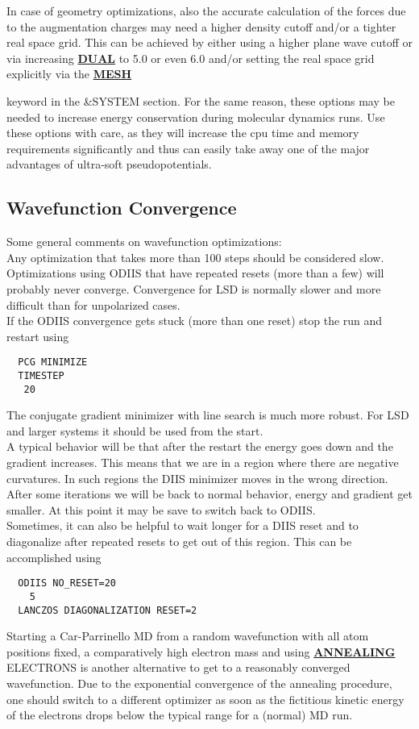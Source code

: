 \documentclass[twoside,10pt,titlepage,a4paper]{article}
\newcommand{\referto}[2]{\hyperlink{#1}{#2}}
\newcommand{\referto}[2]{\htmlref{#2}{#1}}
\newcommand{\refkeyword}[1]{%
\referto{#1}{\textbf{#1}}%
\index{#1}%
}%
\begin{document}
In case of geometry optimizations, also the accurate calculation of the
forces due to the augmentation charges may need a higher density cutoff
and/or a tighter real space grid.
This can be achieved by either using a higher plane wave cutoff or via
increasing \refkeyword{DUAL} to 5.0 or even 6.0 and/or setting
the real space grid explicitly via the \refkeyword{MESH}
keyword in the \&SYSTEM section. For the same reason, these options
may be needed to increase energy conservation during molecular dynamics runs.
Use these options with care, as they will increase the cpu time
and memory requirements significantly and thus can easily take away
one of the major advantages of ultra-soft pseudopotentials.

\subsection{Wavefunction Convergence}\label{hints:wfconv}
Some general comments on wavefunction optimizations:\\[2ex]
%
Any optimization that takes more than 100 steps
should be considered slow.\\[1ex]
%
Optimizations using ODIIS that have repeated resets
(more than a few) will probably never converge.
%
Convergence for LSD is normally slower and more
difficult than for unpolarized cases.\\[1ex]
%
If the ODIIS convergence gets stuck (more than one reset)
stop the run and restart using
\begin{verbatim}
  PCG MINIMIZE
  TIMESTEP
   20
\end{verbatim}
The conjugate gradient minimizer with line search is
much more robust. For LSD and larger systems it should be used from
the start.\\[1ex]
%
A typical behavior will be that after the restart the energy goes down
and the gradient increases. This means that we are in a region where
there are negative curvatures. In such regions the DIIS minimizer moves
in the wrong direction.  After some iterations we will be back to normal
behavior, energy and gradient get smaller. At this point it may be save
to switch back to ODIIS.\\[1ex]
%
Sometimes, it can also be helpful to wait longer for a DIIS reset and to
diagonalize after repeated resets to get out of this region. This can be
accomplished using
\begin{verbatim}
  ODIIS NO_RESET=20
    5
  LANCZOS DIAGONALIZATION RESET=2
\end{verbatim}
%
Starting a Car-Parrinello MD from a random wavefunction with all atom
positions fixed, a comparatively high electron mass and using
\refkeyword{ANNEALING} ELECTRONS is another alternative to get
to a reasonably converged wavefunction. Due to the exponential
convergence of the annealing procedure, one should switch to
a different optimizer as soon as the fictitious kinetic energy of
the electrons drops below the typical range for a (normal) MD run.\\[1ex]
\end{document}

